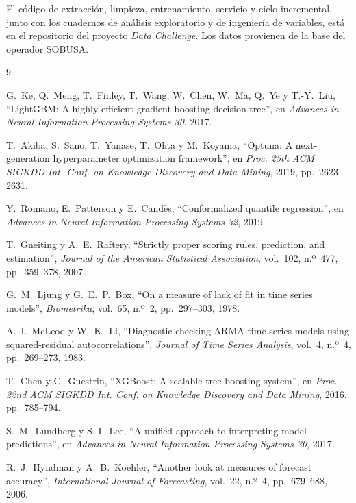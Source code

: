 \documentclass[11pt,a4paper]{article}
\begin{document}
El código de extracción, limpieza, entrenamiento, servicio y ciclo incremental, junto con los cuadernos de análisis exploratorio y de ingeniería de variables, está en el repositorio del proyecto \emph{Data Challenge}. Los datos provienen de la base del operador SOBUSA.

\begin{thebibliography}{9}

G.~Ke, Q.~Meng, T.~Finley, T.~Wang, W.~Chen, W.~Ma, Q.~Ye y T.-Y.~Liu,
``LightGBM: A highly efficient gradient boosting decision tree'',
en \emph{Advances in Neural Information Processing Systems 30}, 2017.

T.~Akiba, S.~Sano, T.~Yanase, T.~Ohta y M.~Koyama,
``Optuna: A next-generation hyperparameter optimization framework'',
en \emph{Proc. 25th ACM SIGKDD Int. Conf. on Knowledge Discovery and Data Mining}, 2019, pp.~2623--2631.

Y.~Romano, E.~Patterson y E.~Candès,
``Conformalized quantile regression'',
en \emph{Advances in Neural Information Processing Systems 32}, 2019.

T.~Gneiting y A.~E.~Raftery,
``Strictly proper scoring rules, prediction, and estimation'',
\emph{Journal of the American Statistical Association}, vol.~102, n.º~477, pp.~359--378, 2007.

G.~M.~Ljung y G.~E.~P.~Box,
``On a measure of lack of fit in time series models'',
\emph{Biometrika}, vol.~65, n.º~2, pp.~297--303, 1978.

A.~I.~McLeod y W.~K.~Li,
``Diagnostic checking ARMA time series models using squared-residual autocorrelations'',
\emph{Journal of Time Series Analysis}, vol.~4, n.º~4, pp.~269--273, 1983.

T.~Chen y C.~Guestrin,
``XGBoost: A scalable tree boosting system'',
en \emph{Proc. 22nd ACM SIGKDD Int. Conf. on Knowledge Discovery and Data Mining}, 2016, pp.~785--794.

S.~M.~Lundberg y S.-I.~Lee,
``A unified approach to interpreting model predictions'',
en \emph{Advances in Neural Information Processing Systems 30}, 2017.

R.~J.~Hyndman y A.~B.~Koehler,
``Another look at measures of forecast accuracy'',
\emph{International Journal of Forecasting}, vol.~22, n.º~4, pp.~679--688, 2006.

\end{thebibliography}
\end{document}
